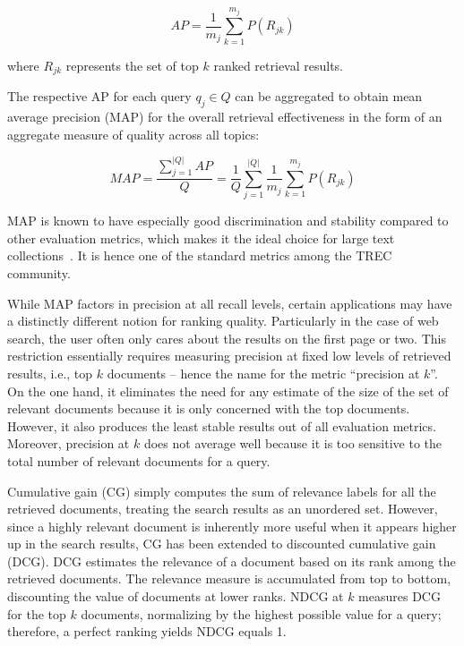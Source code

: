 \begin{equation}
AP = \frac{1}{m_j} \sum^{m_j} _{k = 1} P(R_{jk})
\end{equation}

\noindent where $ R_{jk} $ represents the set of top $ k $ ranked retrieval results.

The respective AP for each query $ q_{j} \in Q $ can be aggregated to obtain mean average precision (MAP) for the overall retrieval effectiveness in the form of an aggregate measure of quality across all topics:

\begin{equation}
MAP = \frac{\sum^{|Q|} _{j = 1} AP}{Q} = \frac{1}{Q} \sum^{|Q|} _{j = 1} \frac{1}{m_j} \sum^{m_j} _{k = 1} P(R_{jk})
\end{equation}


\noindent MAP is known to have especially good discrimination and stability compared to other evaluation metrics, which makes it the ideal choice for large text collections~\cite{manning2010introduction}.
It is hence one of the standard metrics among the TREC community.

\smallskip {}

While MAP factors in precision at all recall levels, certain applications may have a distinctly different notion for ranking quality.
Particularly in the case of web search, the user often only cares about the results on the first page or two.
This restriction essentially requires measuring precision at fixed low levels of retrieved results, i.e., top $ k $ documents -- hence the name for the metric ``precision at $ k $''.
On the one hand, it eliminates the need for any estimate of the size of the set of relevant documents because it is only concerned with the top documents.
However, it also produces the least stable results out of all evaluation metrics.
Moreover, precision at $ k $ does not average well because it is too sensitive to the total number of relevant documents for a query.

\smallskip {}

Cumulative gain (CG) simply computes the sum of relevance labels for all the retrieved documents, treating the search results as an unordered set.
However, since a highly relevant document is inherently more useful when it appears higher up in the search results, CG has been extended to discounted cumulative gain (DCG).
DCG estimates the relevance of a document based on its rank among the retrieved documents.
The relevance measure is accumulated from top to bottom, discounting the value of documents at lower ranks.
NDCG at $ k $ measures DCG for the top $ k $ documents, normalizing by the highest possible value for a query; therefore, a perfect ranking yields NDCG equals 1.

